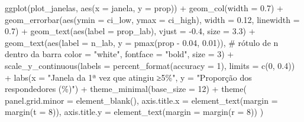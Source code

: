 \documentclass[
]{article}
\newenvironment{Shaded}{\begin{snugshade}}{\end{snugshade}}
\newcommand{\AttributeTok}[1]{\textcolor[rgb]{0.40,0.45,0.13}{#1}}
\newcommand{\CommentTok}[1]{\textcolor[rgb]{0.37,0.37,0.37}{#1}}
\newcommand{\DecValTok}[1]{\textcolor[rgb]{0.68,0.00,0.00}{#1}}
\newcommand{\FloatTok}[1]{\textcolor[rgb]{0.68,0.00,0.00}{#1}}
\newcommand{\FunctionTok}[1]{\textcolor[rgb]{0.28,0.35,0.67}{#1}}
\newcommand{\NormalTok}[1]{\textcolor[rgb]{0.00,0.23,0.31}{#1}}
\newcommand{\SpecialCharTok}[1]{\textcolor[rgb]{0.37,0.37,0.37}{#1}}
\newcommand{\StringTok}[1]{\textcolor[rgb]{0.13,0.47,0.30}{#1}}
\begin{document}
\begin{Shaded}
\begin{Highlighting}[]
\FunctionTok{ggplot}\NormalTok{(plot\_janelas, }\FunctionTok{aes}\NormalTok{(}\AttributeTok{x =}\NormalTok{ janela, }\AttributeTok{y =}\NormalTok{ prop)) }\SpecialCharTok{+}
  \FunctionTok{geom\_col}\NormalTok{(}\AttributeTok{width =} \FloatTok{0.7}\NormalTok{) }\SpecialCharTok{+}
  \FunctionTok{geom\_errorbar}\NormalTok{(}\FunctionTok{aes}\NormalTok{(}\AttributeTok{ymin =}\NormalTok{ ci\_low, }\AttributeTok{ymax =}\NormalTok{ ci\_high), }\AttributeTok{width =} \FloatTok{0.12}\NormalTok{, }\AttributeTok{linewidth =} \FloatTok{0.7}\NormalTok{) }\SpecialCharTok{+}
  \FunctionTok{geom\_text}\NormalTok{(}\FunctionTok{aes}\NormalTok{(}\AttributeTok{label =}\NormalTok{ prop\_lab), }\AttributeTok{vjust =} \SpecialCharTok{{-}}\FloatTok{0.4}\NormalTok{, }\AttributeTok{size =} \FloatTok{3.3}\NormalTok{) }\SpecialCharTok{+}
  \FunctionTok{geom\_text}\NormalTok{(}\FunctionTok{aes}\NormalTok{(}\AttributeTok{label =}\NormalTok{ n\_lab, }\AttributeTok{y =} \FunctionTok{pmax}\NormalTok{(prop }\SpecialCharTok{{-}} \FloatTok{0.04}\NormalTok{, }\FloatTok{0.01}\NormalTok{)), }\CommentTok{\# rótulo de n dentro da barra}
            \AttributeTok{color =} \StringTok{"white"}\NormalTok{, }\AttributeTok{fontface =} \StringTok{"bold"}\NormalTok{, }\AttributeTok{size =} \DecValTok{3}\NormalTok{) }\SpecialCharTok{+}
  \FunctionTok{scale\_y\_continuous}\NormalTok{(}\AttributeTok{labels =} \FunctionTok{percent\_format}\NormalTok{(}\AttributeTok{accuracy =} \DecValTok{1}\NormalTok{), }\AttributeTok{limits =} \FunctionTok{c}\NormalTok{(}\DecValTok{0}\NormalTok{, }\FloatTok{0.4}\NormalTok{)) }\SpecialCharTok{+}
  \FunctionTok{labs}\NormalTok{(}\AttributeTok{x =} \StringTok{"Janela da 1ª vez que atingiu ≥5\%"}\NormalTok{, }\AttributeTok{y =} \StringTok{"Proporção dos respondedores (\%)"}\NormalTok{) }\SpecialCharTok{+}
  \FunctionTok{theme\_minimal}\NormalTok{(}\AttributeTok{base\_size =} \DecValTok{12}\NormalTok{) }\SpecialCharTok{+}
  \FunctionTok{theme}\NormalTok{(}
    \AttributeTok{panel.grid.minor =} \FunctionTok{element\_blank}\NormalTok{(),}
    \AttributeTok{axis.title.x =} \FunctionTok{element\_text}\NormalTok{(}\AttributeTok{margin =} \FunctionTok{margin}\NormalTok{(}\AttributeTok{t =} \DecValTok{8}\NormalTok{)),}
    \AttributeTok{axis.title.y =} \FunctionTok{element\_text}\NormalTok{(}\AttributeTok{margin =} \FunctionTok{margin}\NormalTok{(}\AttributeTok{r =} \DecValTok{8}\NormalTok{))}
\NormalTok{  )}
\end{Highlighting}
\end{Shaded}
\end{document}
